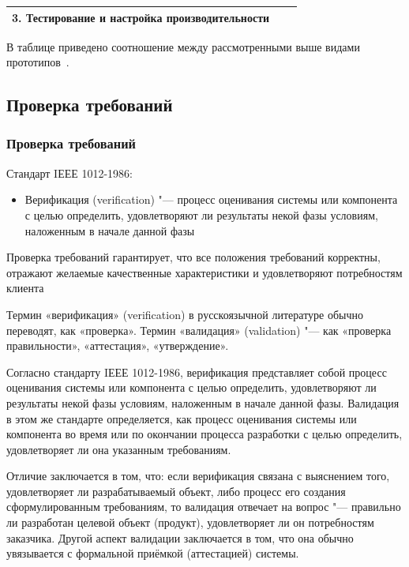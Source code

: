 \documentclass{../industrial-development}
\begin{document}
{\begin{frame}
\begin{table}[h]
\begin{center}
\begin{tabular}{|p{2cm}|p{}|p{4cm}|}
\tiny{3. Тестирование и настройка производительности} \\
\hline

\end{tabular}
\end{center}
\end{table} 

\end{frame}

\lecturenotes

В таблице приведено соотношение между рассмотренными выше видами прототипов~\cite[с.~55]{Maglinec}.

\subsection{Проверка требований}
\begin{frame} \frametitle {Проверка требований}

Стандарт IЕЕЕ 1012-1986:
\begin{itemize}
\item \alert{Верификация} (verification) "--- процесс оценивания системы или компонента с целью определить, удовлетворяют ли результаты некой фазы условиям, наложенным в начале данной фазы
\end{itemize}
Проверка требований гарантирует, что все положения требований корректны, отражают желаемые качественные характеристики и удовлетворяют потребностям клиента 


\end{frame}
\lecturenotes

Термин \alert{«верификация» (verification)} в русскоязычной литературе обычно переводят, как «проверка». Термин \alert{«валидация» (validation)} "--- как «проверка правильности», «аттестация», «утверждение».

Согласно стандарту IЕЕЕ 1012-1986, верификация представляет собой процесс оценивания системы или компонента с целью определить, удовлетворяют ли результаты некой фазы условиям, наложенным в начале данной фазы. Валидация в этом же стандарте определяется, как процесс оценивания системы или компонента во время или по окончании процесса разработки с целью определить, удовлетворяет ли она указанным требованиям.

Отличие заключается в том, что: если верификация связана с выяснением того, удовлетворяет ли разрабатываемый объект, либо
процесс его создания сформулированным требованиям, то валидация отвечает на вопрос "--- правильно ли разработан целевой объект (продукт), удовлетворяет ли он потребностям заказчика. Другой аспект валидации заключается в том, что она обычно увязывается с
формальной приёмкой (аттестацией) системы.

}
\end{document}
